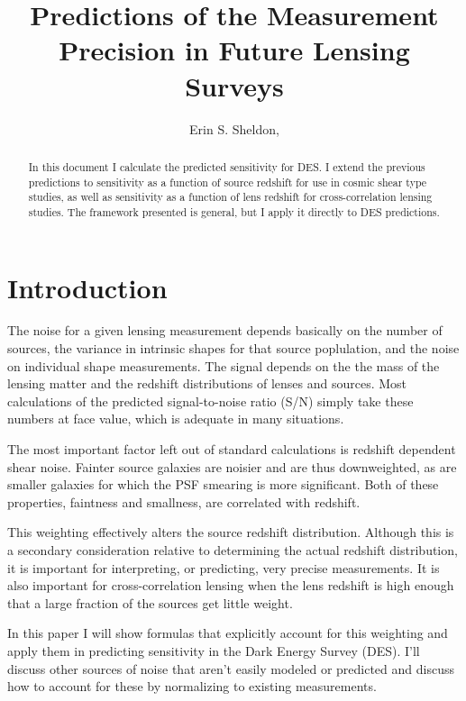 \documentclass[12pt,preprint]{aastex}
\begin{document}
\title{Predictions of the Measurement Precision in Future Lensing Surveys}


\author{ Erin S. Sheldon, }


\begin{abstract} 

In this document I calculate the predicted sensitivity for DES.  I extend the
previous predictions to sensitivity as a function of source redshift for use in
cosmic shear type studies, as well as sensitivity as a function of lens
redshift for cross-correlation lensing studies.  The framework presented is
general, but I apply it directly to DES predictions.

\end{abstract}

\newpage
\tableofcontents


\section{Introduction} \label{sec:intro}

The noise for a given lensing measurement depends basically on the number of
sources, the variance in intrinsic shapes for that source poplulation, and the
noise on individual shape measurements. The signal depends on the the mass of
the lensing matter and the redshift distributions of lenses and sources.  Most
calculations of the predicted signal-to-noise ratio (S/N) simply take these
numbers at face value, which is adequate in many situations. 

The most important factor left out of standard calculations is redshift
dependent shear noise. Fainter source galaxies are noisier and are thus
downweighted, as are smaller galaxies for which the PSF smearing is more
significant. Both of these properties, faintness and smallness, are correlated
with redshift. 

This weighting effectively alters the source redshift distribution.  Although
this is a secondary consideration relative to determining the actual redshift
distribution, it is important for interpreting, or predicting, very precise
measurements. It is also important for cross-correlation lensing when the lens
redshift is high enough that a large fraction of the sources get little weight.

In this paper I will show formulas that explicitly account for this weighting
and apply them in predicting sensitivity in the Dark Energy Survey (DES).  I'll
discuss other sources of noise that aren't easily modeled or predicted and
discuss how to account for these by normalizing to existing measurements.
\end{document}
